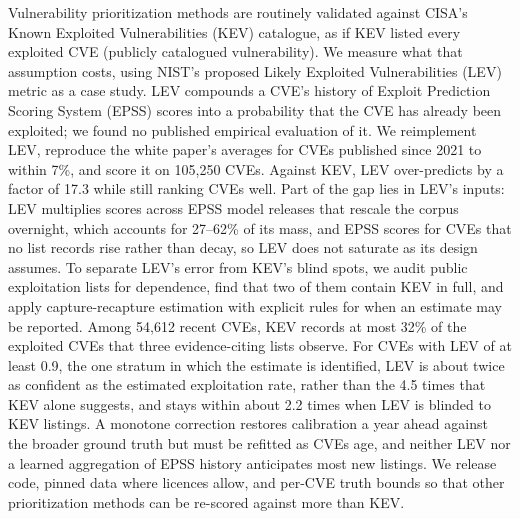 Vulnerability prioritization methods are routinely validated against CISA's
Known Exploited Vulnerabilities (KEV) catalogue, as if KEV listed every
exploited CVE (publicly catalogued vulnerability). We measure what that assumption costs, using NIST's proposed
Likely Exploited Vulnerabilities (LEV) metric as a case study. LEV compounds a
CVE's history of Exploit Prediction Scoring System (EPSS) scores into a
probability that the CVE has already been exploited; we found no published
empirical evaluation of it. We reimplement LEV, reproduce the white paper's
averages for CVEs published since 2021 to within 7\%, and score it on 105,250
CVEs. Against KEV,
LEV over-predicts by a factor of 17.3 while still ranking CVEs well. Part of
the gap lies in LEV's inputs: LEV multiplies scores across EPSS model releases
that rescale the corpus overnight, which accounts for 27--62\% of its mass,
and EPSS scores for CVEs that no list records rise rather than decay, so LEV
does not saturate as its design assumes. To separate LEV's error from KEV's
blind spots, we audit public exploitation lists for dependence, find that two
of them contain KEV in full, and apply capture-recapture estimation with
explicit rules for when an estimate may be reported. Among 54,612 recent
CVEs, KEV records at most 32\% of the exploited CVEs that three
evidence-citing lists observe. For CVEs
with LEV of at least 0.9, the one stratum in which the estimate is identified,
LEV is about twice as confident as the estimated exploitation rate, rather
than the 4.5 times that KEV alone suggests, and stays within about 2.2 times
when LEV is blinded to KEV listings. A monotone correction restores
calibration a year ahead against the broader ground truth but must be refitted
as CVEs age, and neither LEV nor a learned aggregation of EPSS history
anticipates most new listings. We release code, pinned data where licences allow, and per-CVE
truth bounds so that other prioritization methods can be re-scored against more than
KEV.
